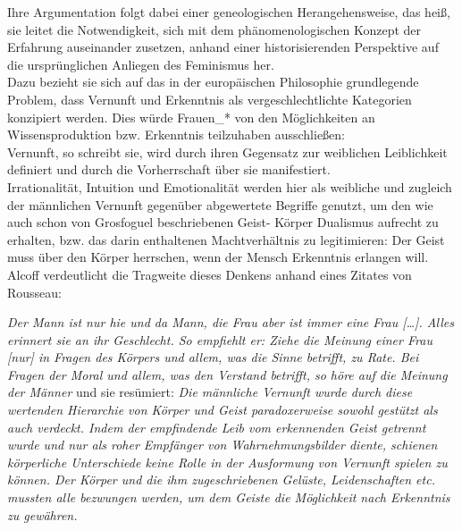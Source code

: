 \noindent Ihre Argumentation folgt dabei
einer geneologischen Herangehensweise, das heiß, sie leitet die Notwendigkeit,
sich mit dem phänomenologischen Konzept der Erfahrung auseinander zusetzen,
anhand einer historisierenden Perspektive auf die ursprünglichen Anliegen des
Feminismus her. \\
Dazu bezieht sie sich auf das in der europäischen Philosophie
grundlegende Problem, dass Vernunft und Erkenntnis als vergeschlechtlichte
Kategorien konzipiert werden. Dies würde Frauen\_* von den Möglichkeiten an
Wissensproduktion bzw. Erkenntnis teilzuhaben ausschließen: \\
Vernunft, so
schreibt sie, wird durch ihren Gegensatz zur weiblichen Leiblichkeit definiert
und durch die Vorherrschaft über sie manifestiert. \footnotemark
{} \\
Irrationalität, Intuition und
Emotionalität werden hier als weibliche und zugleich der männlichen Vernunft
gegenüber abgewertete Begriffe genutzt, um den wie auch schon von Grosfoguel
beschriebenen Geist- Körper Dualismus aufrecht zu erhalten, bzw. das darin
enthaltenen Machtverhältnis zu legitimieren: Der Geist muss über den Körper
herrschen, \glqq wenn der Mensch Erkenntnis erlangen will.\grqq \footnotemark
{}\\
Alcoff verdeutlicht die Tragweite dieses Denkens anhand eines Zitates von Rousseau:
\begin{myenv}
 \textit{
 \glqq Der Mann ist nur hie und da Mann, die Frau aber ist immer eine Frau
 […]. Alles erinnert sie an ihr Geschlecht. So empfiehlt er: Ziehe die Meinung
 einer Frau [nur] in Fragen des Körpers und allem, was die Sinne betrifft, zu
 Rate. Bei Fragen der Moral und allem, was den Verstand betrifft, so höre auf
 die Meinung der Männer \grqq \footnotemark {}} und sie resümiert: \textit{ \glqq Die männliche Vernunft wurde
 durch diese wertenden Hierarchie von Körper und Geist paradoxerweise sowohl
 gestützt als auch verdeckt. Indem der empfindende Leib vom erkennenden Geist
 getrennt wurde und nur als roher Empfänger von Wahrnehmungsbilder diente,
 schienen körperliche Unterschiede keine Rolle in der Ausformung von Vernunft
 spielen zu können. Der Körper und die ihm zugeschriebenen Gelüste,
 Leidenschaften etc. mussten alle bezwungen werden, um dem Geiste die
Möglichkeit nach Erkenntnis zu gewähren.\grqq \footnotemark {} } \end{myenv}
